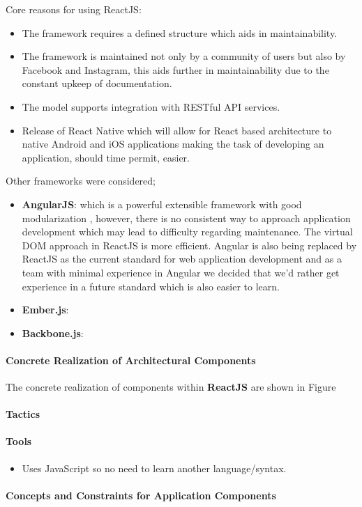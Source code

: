 Core reasons for using ReactJS:
\begin{itemize}
	\item The framework requires a defined structure which aids in maintainability.
	\item The framework is maintained not only by a community of users but also
	by Facebook and Instagram, this aids further in maintainability due to the 
	constant upkeep of documentation.
	\item The model supports integration with RESTful API services.
	\item Release of React Native which will allow for React based architecture 
	to native Android and iOS applications making the task of developing an 
	application, should time permit, easier.
\end{itemize}
Other frameworks were considered;
\begin{itemize}
	\item \textbf{AngularJS}: which is a powerful extensible framework with good modularization
, however, there is no consistent way to approach application development which may 
lead to difficulty regarding maintenance. The virtual DOM approach in ReactJS is more
efficient. Angular is also being replaced by ReactJS as the current standard for web 
application development and as a team with minimal experience in Angular we decided 
that we'd rather get experience in a future standard which is also easier to learn.
	\item \textbf{Ember.js}: 
	\item \textbf{Backbone.js}:
\end{itemize}

\paragraph{Concrete Realization of Architectural Components}
The concrete realization of components within \textbf{ReactJS} are shown in Figure
\paragraph{Tactics}
\paragraph{Tools}
\begin{itemize}
	\item Uses JavaScript so no need to learn another language/syntax.
\end{itemize}
\paragraph{Concepts and Constraints for Application Components}